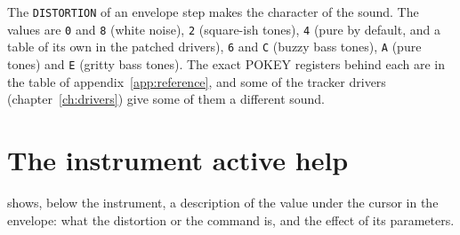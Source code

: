 The \texttt{DISTORTION} of an envelope step makes the character of the sound. The values are
\texttt{0} and \texttt{8} (white noise), \texttt{2} (square-ish tones), \texttt{4} (pure by default, and a table of its own in the
patched drivers), \texttt{6} and \texttt{C} (buzzy bass tones), \texttt{A} (pure tones) and \texttt{E} (gritty bass tones). The
exact POKEY registers behind each are in the table of appendix~\ref{app:reference}, and some of the tracker drivers
(chapter~\ref{ch:drivers}) give some of them a different sound.

\section{The instrument active help}

 shows, below the instrument, a description of the value under the cursor in the
envelope: what the distortion or the command is, and the effect of its parameters.
